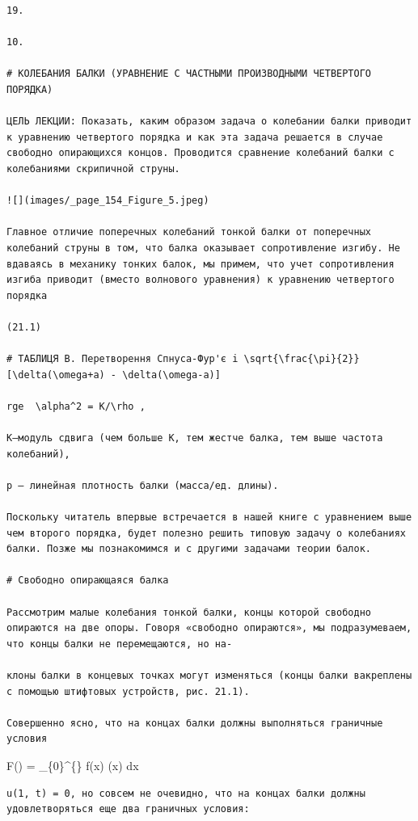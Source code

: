 \documentclass[
  ukrainian,
]{article}
\begin{document}
\begin{verbatim}
19.

10.

# КОЛЕБАНИЯ БАЛКИ (УРАВНЕНИЕ С ЧАСТНЫМИ ПРОИЗВОДНЫМИ ЧЕТВЕРТОГО ПОРЯДКА)

ЦЕЛЬ ЛЕКЦИИ: Показать, каким образом задача о колебании балки приводит к уравнению четвертого порядка и как эта задача решается в случае свободно опирающихся концов. Проводится сравнение колебаний балки с колебаниями скрипичной струны.

![](images/_page_154_Figure_5.jpeg)

Главное отличие поперечных колебаний тонкой балки от поперечных колебаний струны в том, что балка оказывает сопротивление изгибу. Не вдаваясь в механику тонких балок, мы примем, что учет сопротивления изгиба приводит (вместо волнового уравнения) к уравнению четвертого порядка

(21.1)

# ТАБЛИЦЯ B. Перетворення Спнуса-Фур'є i \sqrt{\frac{\pi}{2}}[\delta(\omega+a) - \delta(\omega-a)]

rge  \alpha^2 = K/\rho ,

K—модуль сдвига (чем больше K, тем жестче балка, тем выше частота колебаний),

р — линейная плотность балки (масса/ед. длины).

Поскольку читатель впервые встречается в нашей книге с уравнением выше чем второго порядка, будет полезно решить типовую задачу о колебаниях балки. Позже мы познакомимся и с другими задачами теории балок.

# Свободно опирающаяся балка

Рассмотрим малые колебания тонкой балки, концы которой свободно опираются на две опоры. Говоря «свободно опираются», мы подразумеваем, что концы балки не перемещаются, но на-

клоны балки в концевых точках могут изменяться (концы балки вакреплены с помощью штифтовых устройств, рис. 21.1).

Совершенно ясно, что на концах балки должны выполняться граничные условия
\end{verbatim}

F(\omega) =  \int\_\{0\}\^{}\{\infty\} f(x) \sin(\omega x)
dx

\begin{verbatim}
u(1, t) = 0, но совсем не очевидно, что на концах балки должны удовлетворяться еще два граничных условия:
\end{verbatim}
\end{document}
